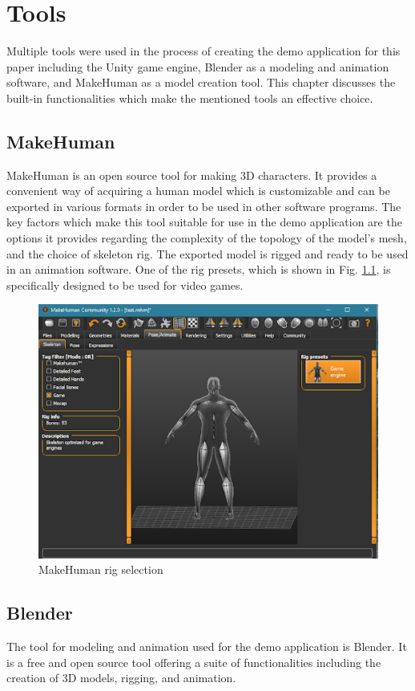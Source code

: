 \chapter{Tools} 
Multiple tools were used in the process of creating the demo application for
this paper including the Unity game engine, Blender as a modeling and animation
software, and MakeHuman as a model creation tool. This chapter discusses the
built-in functionalities which make the mentioned tools an effective choice.

\section{MakeHuman}
MakeHuman is an open source tool for making 3D characters. It provides
a convenient way of acquiring a human model which is customizable and can be
exported in various formats in order to be used in other software programs. The
key factors which make this tool suitable for use in the demo application are the
options it provides regarding the complexity of the topology of the model's
mesh, and the choice of skeleton rig. The exported model is rigged and ready to
be used in an animation software. One of the rig presets, which is shown in Fig.
\ref{fig:mh_rig}, is specifically designed to be used for video games.

\begin{figure}
    \centering
    \includegraphics[width=\textwidth]{grafika/make_human_rig.eps}
    \caption{MakeHuman rig selection}
    \label{fig:mh_rig}
\end{figure}

\section{Blender}
The tool for modeling and animation used for the demo application is
Blender. It is a free and open source tool offering a suite of functionalities
including the creation of 3D models, rigging, and animation. 

